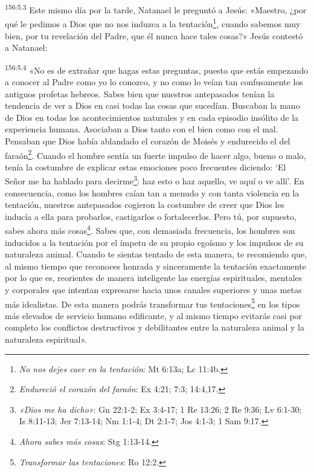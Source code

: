 \par
\textsuperscript{156:5.3} Este mismo día por la tarde, Natanael le preguntó a Jesús: «Maestro, ¿por qué le pedimos a Dios que no nos induzca a la tentación\footnote{\textit{No nos dejes caer en la tentación}: Mt 6:13a; Lc 11:4b.}, cuando sabemos muy bien, por tu revelación del Padre, que él nunca hace tales cosas?» Jesús contestó a Natanael:

\par
\textsuperscript{156:5.4} «No es de extrañar que hagas estas preguntas, puesto que estás empezando a conocer al Padre como yo lo conozco, y no como lo veían tan confusamente los antiguos profetas hebreos. Sabes bien que nuestros antepasados tenían la tendencia de ver a Dios en casi todas las cosas que sucedían. Buscaban la mano de Dios en todas los acontecimientos naturales y en cada episodio insólito de la experiencia humana. Asociaban a Dios tanto con el bien como con el mal. Pensaban que Dios había ablandado el corazón de Moisés y endurecido el del faraón\footnote{\textit{Endureció el corazón del faraón}: Ex 4:21; 7:3; 14:4,17.}. Cuando el hombre sentía un fuerte impulso de hacer algo, bueno o malo, tenía la costumbre de explicar estas emociones poco frecuentes diciendo: `El Señor me ha hablado para decirme\footnote{\textit{«Dios me ha dicho»}: Gn 22:1-2; Ex 3:4-17; 1 Re 13:26; 2 Re 9:36; Lv 6:1-30; Is 8:11-13; Jer 7:13-14; Nm 1:1-4; Dt 2:1-7; Jos 4:1-3; 1 Sam 9:17.}: haz esto o haz aquello, ve aquí o ve allí'. En consecuencia, como los hombres caían tan a menudo y con tanta violencia en la tentación, nuestros antepasados cogieron la costumbre de creer que Dios les inducía a ella para probarlos, castigarlos o fortalecerlos. Pero tú, por supuesto, sabes ahora más cosas\footnote{\textit{Ahora sabes más cosas}: Stg 1:13-14.}. Sabes que, con demasiada frecuencia, los hombres son inducidos a la tentación por el ímpetu de su propio egoísmo y los impulsos de su naturaleza animal. Cuando te sientas tentado de esta manera, te recomiendo que, al mismo tiempo que reconoces honrada y sinceramente la tentación exactamente por lo que es, reorientes de manera inteligente las energías espirituales, mentales y corporales que intentan expresarse hacia unos canales superiores y unas metas más idealistas. De esta manera podrás transformar tus tentaciones\footnote{\textit{Transformar las tentaciones}: Ro 12:2.} en los tipos más elevados de servicio humano edificante, y al mismo tiempo evitarás casi por completo los conflictos destructivos y debilitantes entre la naturaleza animal y la naturaleza espiritual».

